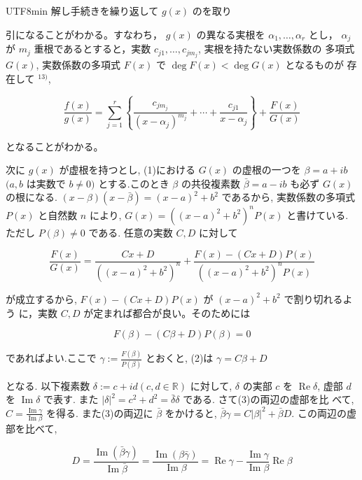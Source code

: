 \documentclass[10pt]{article}
\begin{document}
\begin{CJK}{UTF8}{min}
解し手続きを繰り返して $g(x)$ のを取り

引になることがわかる。すなわち， $g(x)$ の異なる実根を $\alpha_{1}, \ldots, \alpha_{r}$ とし， $\alpha_{j}$ が $m_{j}$ 重根であるとすると，実数 $c_{j 1}, \ldots, c_{j m_{j}}$, 実根を持たない実数係数の 多項式 $G(x)$, 実数係数の多項式 $F(x)$ で $\operatorname{deg} F(x)<\operatorname{deg} G(x)$ となるものが 存在して ${ }^{13)}$,


\begin{equation*}
\frac{f(x)}{g(x)}=\sum_{j=1}^{r}\left\{\frac{c_{j m_{j}}}{\left(x-\alpha_{j}\right)^{m_{j}}}+\cdots+\frac{c_{j 1}}{x-\alpha_{j}}\right\}+\frac{F(x)}{G(x)} \tag{1}
\end{equation*}


となることがわかる。

次に $g(x)$ が虚根を持つとし, (1)における $G(x)$ の虚根の一つを $\beta=a+i b$ $(a, b$ は実数で $b \neq 0)$ とする.このとき $\beta$ の共役複素数 $\bar{\beta}=a-i b$ も必ず $G(x)$ の根になる. $(x-\beta)(x-\bar{\beta})=(x-a)^{2}+b^{2}$ であるから, 実数係数の多項式 $P(x)$ と自然数 $n$ により, $G(x)=\left((x-a)^{2}+b^{2}\right)^{n} P(x)$ と書けている. ただし $P(\beta) \neq 0$ である. 任意の実数 $C, D$ に対して

$$
\frac{F(x)}{G(x)}=\frac{C x+D}{\left((x-a)^{2}+b^{2}\right)^{n}}+\frac{F(x)-(C x+D) P(x)}{\left((x-a)^{2}+b^{2}\right)^{n} P(x)}
$$

が成立するから, $F(x)-(C x+D) P(x)$ が $(x-a)^{2}+b^{2}$ で割り切れるよう に，実数 $C, D$ が定まれば都合が良い。そのためには


\begin{equation*}
F(\beta)-(C \beta+D) P(\beta)=0 \tag{2}
\end{equation*}


であればよい.ここで $\gamma:=\frac{F(\beta)}{P(\beta)}$ とおくと, (2)は $\gamma=C \beta+D$

となる. 以下複素数 $\delta:=c+i d(c, d \in \mathbb{R})$ に対して, $\delta$ の実部 $c$ を $\operatorname{Re} \delta$, 虚部 $d$ を $\operatorname{Im} \delta$ で表す. また $|\delta|^{2}=c^{2}+d^{2}=\bar{\delta} \delta$ である. さて(3)の両辺の虚部を比 べて, $C=\frac{\operatorname{Im} \gamma}{\operatorname{Im} \beta}$ を得る. また(3)の両辺に $\bar{\beta}$ をかけると, $\bar{\beta} \gamma=C|\beta|^{2}+\bar{\beta} D$. この両辺の虚部を比べて,

$$
D=\frac{\operatorname{Im}(\bar{\beta} \gamma)}{\operatorname{Im} \bar{\beta}}=\frac{\operatorname{Im}(\beta \bar{\gamma})}{\operatorname{Im} \beta}=\operatorname{Re} \gamma-\frac{\operatorname{Im} \gamma}{\operatorname{Im} \beta} \operatorname{Re} \beta
$$


\end{CJK}
\end{document}
